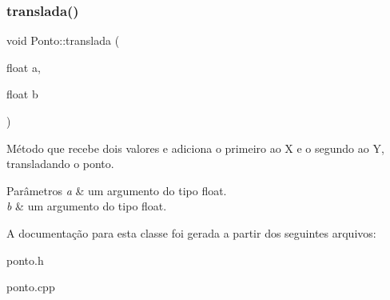\subsubsection{\texorpdfstring{translada()}{translada()}}
{\footnotesize\ttfamily void Ponto\+::translada (\begin{DoxyParamCaption}\item[{float}]{a,  }\item[{float}]{b }\end{DoxyParamCaption})}



Método que recebe dois valores e adiciona o primeiro ao X e o segundo ao Y, transladando o ponto. 


\begin{DoxyParams}{Parâmetros}
{\em a} & um argumento do tipo float. \\
\hline
{\em b} & um argumento do tipo float. \\
\hline
\end{DoxyParams}


A documentação para esta classe foi gerada a partir dos seguintes arquivos\+:\begin{DoxyCompactItemize}
\item 
ponto.\+h\item 
ponto.\+cpp\end{DoxyCompactItemize}
